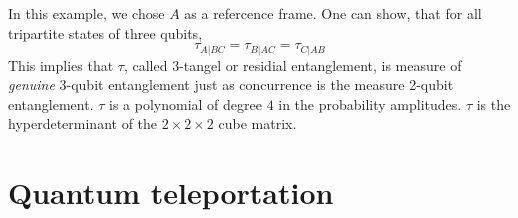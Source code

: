 \documentclass[12pt]{book}
\theoremstyle{definition}
\begin{document}
In this example, we chose $A$ as a refercence frame. One can show, that for all tripartite states of three qubits,
\begin{equation*}
  \tau_{A\vert BC} = \tau_{B \vert AC} = \tau_{C \vert AB}
\end{equation*}
This implies that $\tau$, called 3-tangel or residial entanglement, is measure of \emph{genuine} 3-qubit entanglement just as concurrence is the measure 2-qubit entanglement. $\tau$ is a polynomial of degree $4$ in the probability amplitudes. $\tau$ is the hyperdeterminant of the $2 \times 2 \times 2$ cube matrix.

\section{Quantum teleportation}
\end{document}
